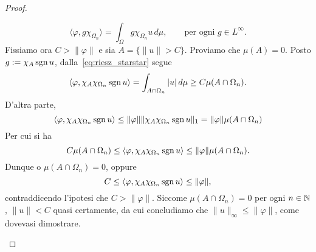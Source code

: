 \begin{proof}
\begin{enumerate}
		\begin{equation}
		\label{eq:riesz_starstar}
			\langle \varphi, g \chi_{\Omega_n} \rangle = \int_\Omega g \chi_{\Omega_n} u\,d\mu, \qquad \text{per ogni $g \in L^\infty$}.
		\end{equation}
		Fissiamo ora $C > \|\varphi\|$ e sia $A = \{\|u\| > C\}$. Proviamo che $\mu(A) = 0$. Posto $g := \chi_A \operatorname{sgn} u$, dalla~\eqref{eq:riesz_starstar} segue
		\begin{equation*}
			\langle \varphi, \chi_A \chi_{\Omega_n} \operatorname{sgn} u \rangle = \int_{A \cap \Omega_n} |u|\,d\mu \geq C \mu(A \cap \Omega_n).
		\end{equation*}
		D'altra parte,
		\begin{equation*}
			\langle \varphi, \chi_A \chi_{\Omega_n} \operatorname{sgn} u \rangle \leq \|\varphi\| \|\chi_A \chi_{\Omega_n} \operatorname{sgn} u\|_1 = \|\varphi\| \mu(A \cap \Omega_n)
		\end{equation*}
		Per cui si ha
		\begin{equation*}
			C \mu(A \cap \Omega_n) \leq \langle \varphi, \chi_A \chi_{\Omega_n} \operatorname{sgn} u \rangle \leq \|\varphi\| \mu(A \cap \Omega_n).
		\end{equation*}
		Dunque o $\mu(A \cap \Omega_n) = 0$, oppure
		\begin{equation*}
			C \leq \langle \varphi, \chi_A \chi_{\Omega_n} \operatorname{sgn} u \rangle \leq \|\varphi\|,
		\end{equation*}
		contraddicendo l'ipotesi che $C > \|\varphi\|$. Siccome $\mu(A \cap \Omega_n) = 0$ per ogni $n \in \mathbb{N}$, $\|u\| < C$ quasi certamente, da cui concludiamo che $\|u\|_\infty \leq \|\varphi\|$, come dovevasi dimostrare.


\end{enumerate}
\end{proof}
